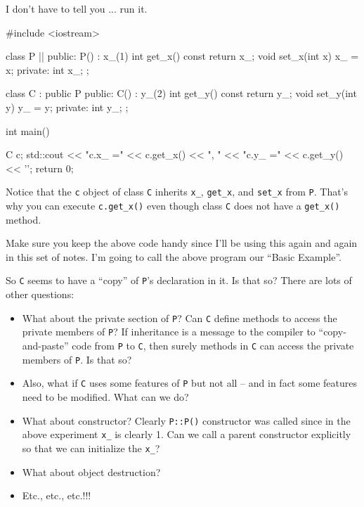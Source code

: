 I don't have to tell you ... run it.

\begin{consolethree}[escapeinside=||]
#include <iostream>

class P
{
||
public:
        P() : x_(1) {}
        int get_x() const { return x_; }
        void set_x(int x) { x_ = x; }
private:
        int x_;
};

class C : public P
{
public:
        C() : y_(2) {}
        int get_y() const { return y_; }
        void set_y(int y) { y_ = y; }
private:
        int y_;
};

int main()
{   
    C c;
    std::cout << "c.x_ =" << c.get_x() << ", "
              << "c.y_ =" << c.get_y() << '\n';
return 0;

} 
\end{consolethree}

Notice that the \texttt{c} object of class \texttt{C} inherits \verb!x_!,
\verb!get_x!, and \verb!set_x! from \texttt{P}. That's why you can
execute \verb!c.get_x()! even though class \texttt{C} does not have a
\verb!get_x()! method.

Make sure you keep the above code handy since I'll be using this again
and again in this set of notes. I'm going to call the above program our
``Basic Example''.




So \verb!C! seems to have a ``copy'' of \verb!P!'s
declaration in it. Is that so? There are lots of other questions:

\begin{itemize}
\item
  What about the private section of \verb!P!? Can \verb!C! define
  methods to access the private members of \verb!P!? If inheritance is a
  message to the compiler to ``copy-and-paste'' code from \verb!P! to
  \verb!C!, then surely methods in \verb!C! can access the private
  members of \verb!P!. Is that so?
\item
  Also, what if \verb!C! uses some features of \verb!P! but not all --
  and in fact some features need to be modified. What can we do?
\item
  What about constructor? Clearly \verb!P::P()! constructor was called
  since in the above experiment \verb!x_! is clearly 1. Can we call a
  parent constructor explicitly so that we can initialize the
  \verb!x_!?
\item
  What about object destruction?
\item
  Etc., etc., etc.!!!
\end{itemize}



